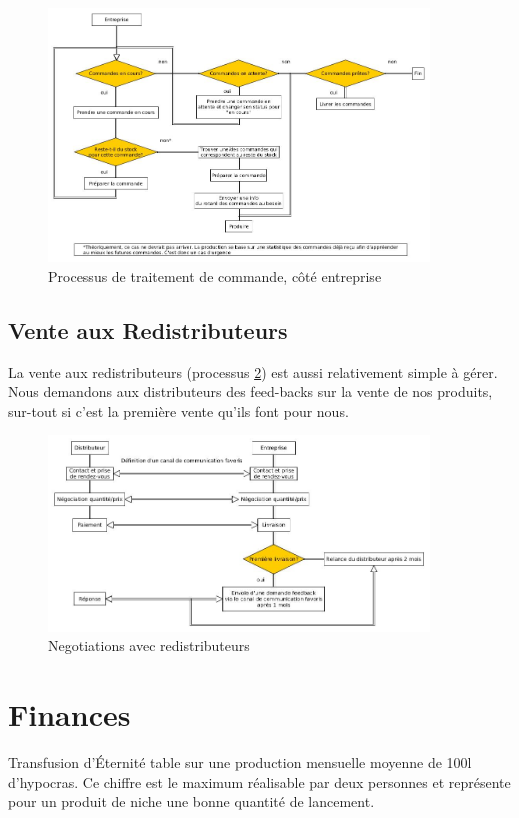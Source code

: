 \documentclass[10pt,a4paper]{article}
\newcommand{\tde}{Transfusion d'Éternité}
\begin{document}
\begin{figure}[h!]
\centering
\includegraphics[width=0.9\textwidth]{../flowchart/commande.jpg}
\caption{Processus de traitement de commande, côté entreprise}
\label{cmdUsine}
\end{figure}

\subsection{Vente aux Redistributeurs}
La vente aux redistributeurs (processus \ref{redist}) est aussi relativement simple à gérer.
Nous demandons aux distributeurs des feed-backs sur la vente de nos produits, sur-tout si c'est la première vente qu'ils font pour nous.

\begin{figure}[h!]
\centering
\includegraphics[width=0.9\textwidth]{../flowchart/distributeur.jpg}
\caption{Negotiations avec redistributeurs}
\label{redist}
\end{figure}

\clearpage
\section{Finances}
\tde{} table sur une production mensuelle moyenne de 100l d'hypocras.
Ce chiffre est le maximum réalisable par deux personnes et représente pour un produit de niche une bonne quantité de lancement.
\end{document}
